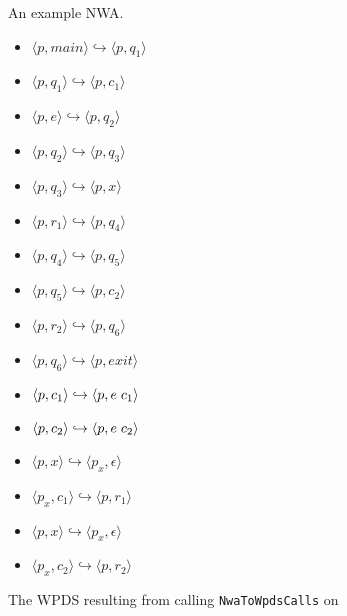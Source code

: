 \begin{figure}[p]
  \centering
  \begin{minipage}{\textwidth}
    \caption{An example NWA.}
    \label{Fi:NwaToWpds1}
  \end{minipage}
  \begin{minipage}{0.42\textwidth}
    \begin{itemize}
      \centering
      \item{ $\langle p,main \rangle \hookrightarrow \langle p,q_1 \rangle$}
      \item{ $\langle p,q_1 \rangle \hookrightarrow \langle p,c_1 \rangle$}
      \item{ $\langle p,e \rangle \hookrightarrow \langle p,q_2 \rangle$}
      \item{ $\langle p,q_2 \rangle \hookrightarrow \langle p,q_3 \rangle$}
      \item{ $\langle p,q_3 \rangle \hookrightarrow \langle p,x \rangle$}
      \item{ $\langle p,r_1 \rangle \hookrightarrow \langle p,q_4 \rangle$}
      \item{ $\langle p,q_4 \rangle \hookrightarrow \langle p,q_5 \rangle$}
      \item{ $\langle p,q_5 \rangle \hookrightarrow \langle p,c_2 \rangle$}
      \item{ $\langle p,r_2 \rangle \hookrightarrow \langle p,q_6 \rangle$}
      \item{ $\langle p,q_6 \rangle \hookrightarrow \langle p,exit \rangle$}
      \item{ $\langle p,c_1 \rangle \hookrightarrow \langle p,e \hspace{.1cm} c_1 \rangle$}
      \item{ $\langle p,c_2 \rangle \hookrightarrow \langle p,e \hspace{.1cm} c_2 \rangle$}
      \item{ $\langle p,x \rangle \hookrightarrow \langle p_x, \epsilon \rangle$}
      \item{ $\langle p_x,c_1 \rangle \hookrightarrow \langle p,r_1 \rangle$}
      \item{ $\langle p,x \rangle \hookrightarrow \langle p_x, \epsilon \rangle$}
      \item{ $\langle p_x,c_2 \rangle \hookrightarrow \langle p,r_2 \rangle$}
    \end{itemize}
    \caption{The WPDS resulting from calling \texttt{NwaToWpdsCalls} on }
    \label{Fi:NwaToWpds4}

\end{minipage}
\end{figure}
